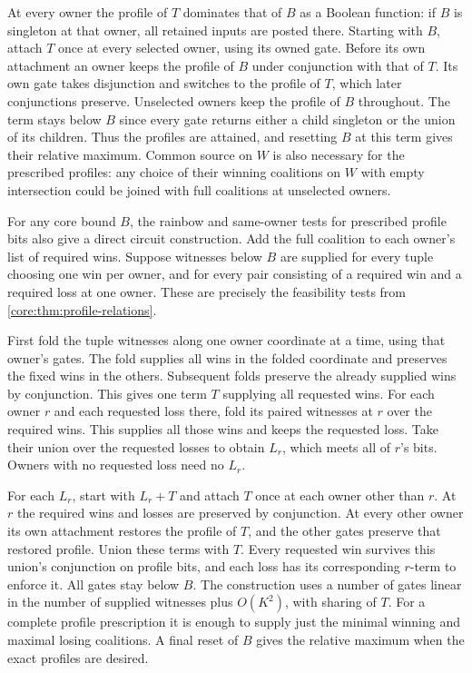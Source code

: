 At every owner the profile of $T$ dominates that of
$B$ as a Boolean function: if $B$ is singleton at that
owner, all retained inputs are posted there. Starting
with $B$, attach $T$ once at every selected owner,
using its owned gate. Before its own attachment an
owner keeps the profile of $B$ under conjunction with
that of $T$. Its own gate takes disjunction and switches
to the profile of $T$, which later conjunctions preserve.
Unselected owners keep the profile of $B$ throughout.
The term stays below $B$ since every gate returns either
a child singleton or the union of its children. Thus
the profiles are attained, and resetting $B$ at this term
gives their relative maximum. Common source on $W$ is
also necessary for the prescribed profiles: any choice
of their winning coalitions on $W$ with empty intersection
could be joined with full coalitions at unselected owners.

For any core bound $B$, the rainbow and same-owner
tests for prescribed profile bits also give a direct
circuit construction. Add the full coalition to each
owner's list of required wins. Suppose witnesses below
$B$ are supplied for every tuple choosing one win per
owner, and for every pair consisting of a required win
and a required loss at one owner. These are precisely
the feasibility tests from \cref{core:thm:profile-relations}.

First fold the tuple witnesses along one owner coordinate
at a time, using that owner's gates. The fold supplies
all wins in the folded coordinate and preserves the fixed
wins in the others. Subsequent folds preserve the already
supplied wins by conjunction. This gives one term $T$
supplying all requested wins. For each owner $r$ and
each requested loss there, fold its paired witnesses at
$r$ over the required wins. This supplies all those wins
and keeps the requested loss. Take their union over the
requested losses to obtain $L_r$, which meets all of
$r$'s bits. Owners with no requested loss need no $L_r$.

For each $L_r$, start with $L_r+T$ and attach $T$ once
at each owner other than $r$. At $r$ the required wins
and losses are preserved by conjunction. At every other
owner its own attachment restores the profile of $T$,
and the other gates preserve that restored profile.
Union these terms with $T$. Every requested win survives
this union's conjunction on profile bits, and each loss
has its corresponding $r$-term to enforce it. All gates
stay below $B$. The construction uses a number of gates
linear in the number of supplied witnesses plus $O(K^2)$,
with sharing of $T$. For a complete profile prescription
it is enough to supply just the minimal winning and
maximal losing coalitions. A final reset of $B$ gives
the relative maximum when the exact profiles are desired.

